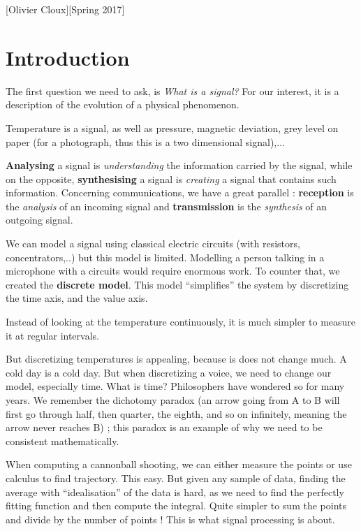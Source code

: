 \documentclass[11pt,a4paper]{article}
\numberwithin{equation}{section}
\begin{document}
[Olivier Cloux][Spring 2017]
\tableofcontents

\section{Introduction}
The first question we need to ask, is \textit{What is a signal?} For our interest, it is a description of the evolution of a physical phenomenon.
\begin{example}
    Temperature is a signal, as well as pressure, magnetic deviation, grey level on paper (for a photograph, thus this is a two dimensional signal),...
\end{example}

\textbf{Analysing} a signal is \textit{understanding} the information carried by the signal, while on the opposite, \textbf{synthesising} a signal is \textit{creating} a signal that contains such information.
Concerning communications, we have a great parallel : \textbf{reception} is the \textit{analysis} of an incoming signal and \textbf{transmission} is the \textit{synthesis} of an outgoing signal.

We can model a signal using classical electric circuits (with resistors, concentrators,..) but this model is limited. Modelling a person talking in a microphone with a circuits would require enormous work. To counter that, we created the \textbf{discrete model}. This model ``simplifies'' the system by discretizing the time axis, and the value axis. 

\begin{example}
    Instead of looking at the temperature continuously, it is much simpler to measure it at regular intervals.
\end{example}
But discretizing temperatures is appealing, because is does not change much. A cold day is a cold day. But when discretizing a voice, we need to change our model, especially time. What is time? Philosophers have wondered so for many years. We remember the dichotomy paradox (an arrow going from A to B will first go through half, then quarter, the eighth, and so on infinitely, meaning the arrow never reaches B) ; this paradox is an example of why we need to be consistent mathematically. 

When computing a cannonball shooting, we can either measure the points or use calculus to find trajectory. This easy. But given any sample of data, finding the average with ``idealisation'' of the data is hard, as we need to find the perfectly fitting function and then compute the integral. Quite simpler to sum the points and divide by the number of points ! This is what signal processing is about.
\end{document}
